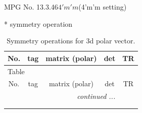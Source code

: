 \documentclass[fleqn,8pt]{jsarticle}
\begin{document}
\setcounter{MaxMatrixCols}{32}

\renewcommand{\tablename}{Table~}
\renewcommand{\figurename}{Figure~}
\begin{center}
\LARGE
MPG No. 13.3.46\quad$4'm'm$\quad(4'm'm setting)
\end{center}
* symmetry operation
\renewcommand{\arraystretch}{1.3}
\begin{longtable}{ccccc}
\caption{Symmetry operations for 3d polar vector.}
 \\
 \hline \hline
No. & tag & matrix (polar) & det & TR \\ \hline \endfirsthead

\multicolumn{4}{l}{\tablename\ \thetable{}} \\
 \hline \hline
No. & tag & matrix (polar) & det & TR \\ \hline \endhead

 \hline \hline
\multicolumn{4}{r}{\footnotesize\it continued ...} \\ \endfoot

 \hline \hline
\multicolumn{4}{r}{} \\ \endlastfoot


\end{longtable}
\end{document}
